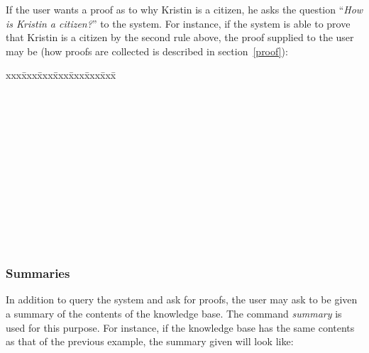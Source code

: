 If the user wants a proof as to why Kristin is a citizen, he asks the
question ``{\em How is Kristin a citizen?\/}'' to the system. For
instance, if the system is able to prove that Kristin is a citizen by
the second rule above, the proof supplied to the user may be (how
proofs are collected is described in section~\ref{proof}):

\begin{tabbing}
  xxx\= xxx\= xxx\= xxx\= xxx\= xxx\= xxx\= \kill
  \>\\
  \>\\
  \>\>\\
  \>\>\\
  \>\>\\
  \>\>\\
  \>\>\\
  \\
  \>\\
  \>\\
  \>\\
  \>\\
  \>\\
  \>
\end{tabbing}

\subsubsection{Summaries}

In addition to query the system and ask for proofs, the user may ask
to be given a summary of the contents of the knowledge base. The
command {\em summary\/} is used for this purpose. For instance, if the
knowledge base has the same contents as that of the previous example,
the summary given will look like:

